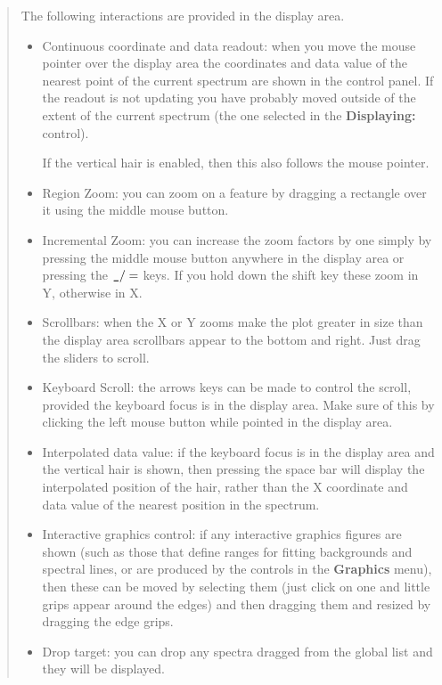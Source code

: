 \documentclass[twoside,11pt]{article}
\renewcommand{\_}{\texttt{\symbol{95}}}
\newcommand{\menuitem}[1]{\textbf{#1}}
\newcommand{\labelitem}[1]{\textbf{#1}}
\begin{document}
\begin{quote}
 The following interactions are provided in the display area.
 \begin{itemize}

  \item Continuous coordinate and data readout: when you move the mouse
  pointer over the display area the coordinates and data value of the nearest
  point of the current spectrum are shown in the control panel.  If the
  readout is not updating you have probably moved outside of the extent of the
  current spectrum (the one selected in the \labelitem{Displaying:} control).

  If the vertical hair is enabled, then this also follows the mouse
  pointer.

  \item Region Zoom: you can zoom on a feature by dragging a rectangle
  over it using the middle mouse button.

  \item Incremental Zoom: you can increase the zoom factors by one
  simply by pressing the middle mouse button anywhere in the display
  area or pressing the $\_/=$ keys. If you hold down the shift key
  these zoom in Y, otherwise in X.

  \item Scrollbars: when the X or Y zooms make the plot greater in size
  than the display area scrollbars appear to the bottom and right. Just
  drag the sliders to scroll.

  \item Keyboard Scroll: the arrows keys can be made to control the
  scroll, provided the keyboard focus is in the display area. Make sure
  of this by clicking the left mouse button while pointed in the display
  area.

  \item Interpolated data value: if the keyboard focus is in the
  display area and the vertical hair is shown, then pressing the space
  bar will display the interpolated position of the hair, rather than
  the X coordinate and data value of the nearest position in the
  spectrum.

  \item Interactive graphics control: if any interactive graphics figures are
  shown (such as those that define ranges for fitting backgrounds and spectral
  lines, or are produced by the controls in the \menuitem{Graphics} menu),
  then these can be moved by selecting them (just click on one and little
  grips appear around the edges) and then dragging them and resized by
  dragging the edge grips.

  \item Drop target: you can drop any spectra dragged from the global
  list and they will be displayed.

 \end{itemize}
\end{quote}
\end{document}
